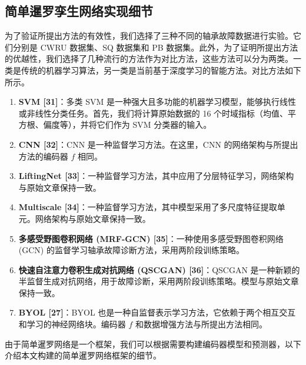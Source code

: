 \documentclass[master]{thesis-uestc}
\begin{document}
\subsection{简单暹罗孪生网络实现细节}
为了验证所提出方法的有效性，我们选择了三种不同的轴承故障数据进行实验。它们分别是 CWRU 数据集、SQ 数据集和 PB 数据集。此外，为了证明所提出方法的优越性，我们选择了几种流行的方法作为对比方法，这些方法可以分为两类。一类是传统的机器学习算法，另一类是当前基于深度学习的智能方法。对比方法如下所示。
\begin{enumerate}
    \item \textbf{SVM [31]}：多类 SVM 是一种强大且多功能的机器学习模型，能够执行线性或非线性分类任务。首先，我们将计算原始数据的 16 个时域指标（均值、平方根、偏度等），并将它们作为 SVM 分类器的输入。

    \item \textbf{CNN [32]}：CNN 是一种监督学习方法。在这里，CNN 的网络架构与所提出方法的编码器 \(f\) 相同。

    \item \textbf{LiftingNet [33]}：一种监督学习方法，其中应用了分层特征学习，网络架构与原始文章保持一致。

    \item \textbf{Multiscale [34]}：一种监督学习方法，其中模型采用了多尺度特征提取单元。网络架构与原始文章保持一致。

    \item \textbf{多感受野图卷积网络 (MRF-GCN) [35]}：一种使用多感受野图卷积网络 (GCN) 的监督学习轴承故障诊断方法，采用两阶段训练策略。

    \item \textbf{快速自注意力卷积生成对抗网络 (QSCGAN) [36]}：QSCGAN 是一种新颖的半监督生成对抗网络，用于故障诊断，采用两阶段训练策略。模型与原始文章保持一致。

    \item \textbf{BYOL [27]}：BYOL 也是一种自监督表示学习方法，它依赖于两个相互交互和学习的神经网络块。编码器 \(f\) 和数据增强方法与所提出方法相同。
\end{enumerate}
由于简单暹罗网络是一个框架，我们可以根据需要构建编码器模型和预测器，以下介绍本文构建的简单暹罗网络框架的细节。
\end{document}
